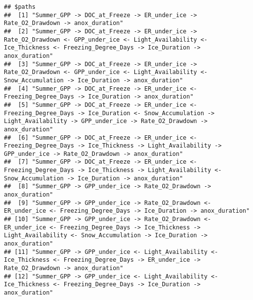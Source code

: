 \documentclass[]{article}
\begin{document}
\begin{verbatim}
## $paths
##  [1] "Summer_GPP -> DOC_at_Freeze -> ER_under_ice -> Rate_O2_Drawdown -> anox_duration"                                                                                                                              
##  [2] "Summer_GPP -> DOC_at_Freeze -> ER_under_ice -> Rate_O2_Drawdown <- GPP_under_ice <- Light_Availability <- Ice_Thickness <- Freezing_Degree_Days -> Ice_Duration -> anox_duration"                              
##  [3] "Summer_GPP -> DOC_at_Freeze -> ER_under_ice -> Rate_O2_Drawdown <- GPP_under_ice <- Light_Availability <- Snow_Accumulation -> Ice_Duration -> anox_duration"                                                  
##  [4] "Summer_GPP -> DOC_at_Freeze -> ER_under_ice <- Freezing_Degree_Days -> Ice_Duration -> anox_duration"                                                                                                          
##  [5] "Summer_GPP -> DOC_at_Freeze -> ER_under_ice <- Freezing_Degree_Days -> Ice_Duration <- Snow_Accumulation -> Light_Availability -> GPP_under_ice -> Rate_O2_Drawdown -> anox_duration"                          
##  [6] "Summer_GPP -> DOC_at_Freeze -> ER_under_ice <- Freezing_Degree_Days -> Ice_Thickness -> Light_Availability -> GPP_under_ice -> Rate_O2_Drawdown -> anox_duration"                                              
##  [7] "Summer_GPP -> DOC_at_Freeze -> ER_under_ice <- Freezing_Degree_Days -> Ice_Thickness -> Light_Availability <- Snow_Accumulation -> Ice_Duration -> anox_duration"                                              
##  [8] "Summer_GPP -> GPP_under_ice -> Rate_O2_Drawdown -> anox_duration"                                                                                                                                              
##  [9] "Summer_GPP -> GPP_under_ice -> Rate_O2_Drawdown <- ER_under_ice <- Freezing_Degree_Days -> Ice_Duration -> anox_duration"                                                                                      
## [10] "Summer_GPP -> GPP_under_ice -> Rate_O2_Drawdown <- ER_under_ice <- Freezing_Degree_Days -> Ice_Thickness -> Light_Availability <- Snow_Accumulation -> Ice_Duration -> anox_duration"                          
## [11] "Summer_GPP -> GPP_under_ice <- Light_Availability <- Ice_Thickness <- Freezing_Degree_Days -> ER_under_ice -> Rate_O2_Drawdown -> anox_duration"                                                               
## [12] "Summer_GPP -> GPP_under_ice <- Light_Availability <- Ice_Thickness <- Freezing_Degree_Days -> Ice_Duration -> anox_duration"                                                                                   

\end{verbatim}
\end{document}
